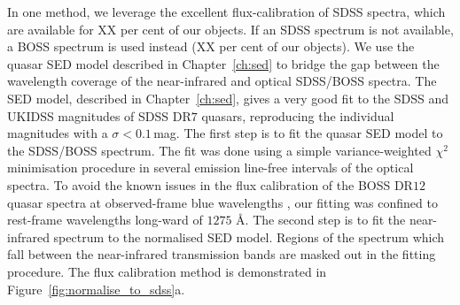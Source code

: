 In one method, we leverage the excellent flux-calibration of SDSS spectra, which are available for XX per cent of our objects.
If an SDSS spectrum is not available, a BOSS spectrum is used instead (XX per cent of our objects). 
We use the quasar SED model described in Chapter~\ref{ch:sed} to bridge the gap between the wavelength coverage of the near-infrared and optical SDSS/BOSS spectra.
The SED model, described in Chapter~\ref{ch:sed}, gives a very good fit to the SDSS and UKIDSS magnitudes of SDSS DR$7$ quasars, reproducing the individual magnitudes with a $\sigma <0.1$\,mag.
The first step is to fit the quasar SED model to the SDSS/BOSS spectrum. 
The fit was done using a simple variance-weighted $\chi^2$ minimisation procedure in several emission line-free intervals of the optical spectra.   
To avoid the known issues in the flux calibration of the BOSS DR$12$ quasar spectra at observed-frame blue wavelengths \citep{lee13}, our fitting was confined to rest-frame wavelengths long-ward of $1275$ \AA. 
The second step is to fit the near-infrared spectrum to the normalised SED model. 
Regions of the spectrum which fall between the near-infrared transmission bands are masked out in the fitting procedure. 
The flux calibration method is demonstrated in Figure~\ref{fig:normalise_to_sdss}a. 

